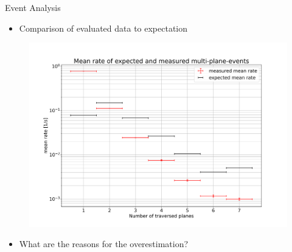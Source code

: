 \begin{frame}{Event Analysis}
  \begin{itemize}
    \item Comparison of evaluated data to expectation
  \end{itemize}
  \begin{figure}[H]
    \centering
    \includegraphics[width=.8\textwidth]{rate_comparison}
  \end{figure}
  \begin{itemize}
	\item What are the reasons for the overestimation?
  \end{itemize}
\end{frame}

